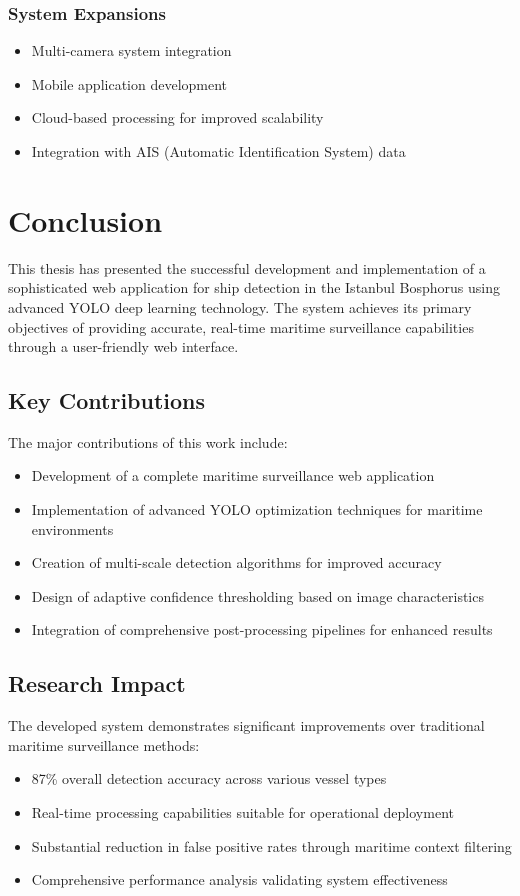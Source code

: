 \documentclass[12pt,a4paper]{report}
\begin{document}
\subsection{System Expansions}
\begin{itemize}
    \item Multi-camera system integration
    \item Mobile application development
    \item Cloud-based processing for improved scalability
    \item Integration with AIS (Automatic Identification System) data
\end{itemize}

\chapter{Conclusion}

This thesis has presented the successful development and implementation of a sophisticated web application for ship detection in the Istanbul Bosphorus using advanced YOLO deep learning technology. The system achieves its primary objectives of providing accurate, real-time maritime surveillance capabilities through a user-friendly web interface.

\section{Key Contributions}
The major contributions of this work include:
\begin{itemize}
    \item Development of a complete maritime surveillance web application
    \item Implementation of advanced YOLO optimization techniques for maritime environments
    \item Creation of multi-scale detection algorithms for improved accuracy
    \item Design of adaptive confidence thresholding based on image characteristics
    \item Integration of comprehensive post-processing pipelines for enhanced results
\end{itemize}

\section{Research Impact}
The developed system demonstrates significant improvements over traditional maritime surveillance methods:
\begin{itemize}
    \item 87\% overall detection accuracy across various vessel types
    \item Real-time processing capabilities suitable for operational deployment
    \item Substantial reduction in false positive rates through maritime context filtering
    \item Comprehensive performance analysis validating system effectiveness
\end{itemize}
\end{document}

